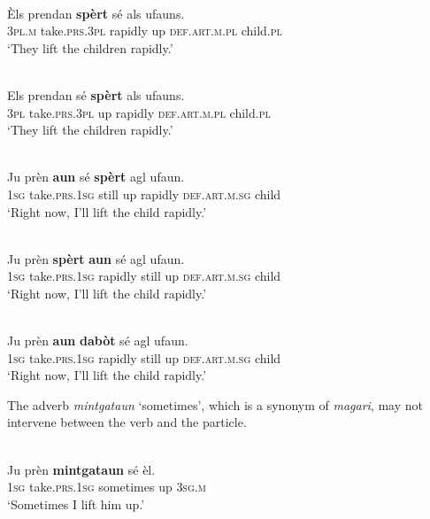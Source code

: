\ea
\label{ex:pv:12}
\\
\gll Èls prendan \textbf{spèrt} sé als ufauns.   \\
\textsc{3pl.m} take.\textsc{prs.3pl} rapidly up \textsc{def.art.m.pl} child.\textsc{pl}  \\
\glt `They lift the children rapidly.'
\z

\ea
\label{ex:pv:13}
\\
\gll Els prendan sé \textbf{spèrt} als ufauns.   \\
   \textsc{3pl} take.\textsc{prs.3pl} up rapidly \textsc{def.art.m.pl} child.\textsc{pl}  \\
\glt `They lift the children rapidly.'
\z

\ea
\label{ex:pv:14}
\\
\gll Ju prèn \textbf{aun} sé \textbf{spèrt} agl ufaun.    \\
    \textsc{1sg} take.\textsc{prs.1sg} still up rapidly \textsc{def.art.m.sg} child \\
\glt `Right now, I’ll lift the child rapidly.'
\z

\ea
\label{ex:pv:15}
\\
\gll Ju prèn \textbf{spèrt} \textbf{aun} sé agl ufaun.    \\
    \textsc{1sg} take.\textsc{prs.1sg} rapidly still up \textsc{def.art.m.sg} child \\
\glt `Right now, I’ll lift the child rapidly.'
\z

\ea
\label{ex:pv:16}
\\
\gll Ju prèn \textbf{aun} \textbf{dabòt} sé agl ufaun.    \\
    \textsc{1sg} take.\textsc{prs.1sg} rapidly still up \textsc{def.art.m.sg} child \\
\glt `Right now, I’ll lift the child rapidly.'
\z

The adverb \textit{mintgataun} `sometimes', which is a synonym of \textit{magari}, may not intervene between the verb and the particle.%

\ea
\label{17ex:pv:}
\\
\gll   *Ju prèn \textbf{mintgataun} sé èl. \\
     \textsc{1sg} take.\textsc{prs.1sg} sometimes up \textsc{3sg.m}\\
\glt `Sometimes I lift him up.'
\z


